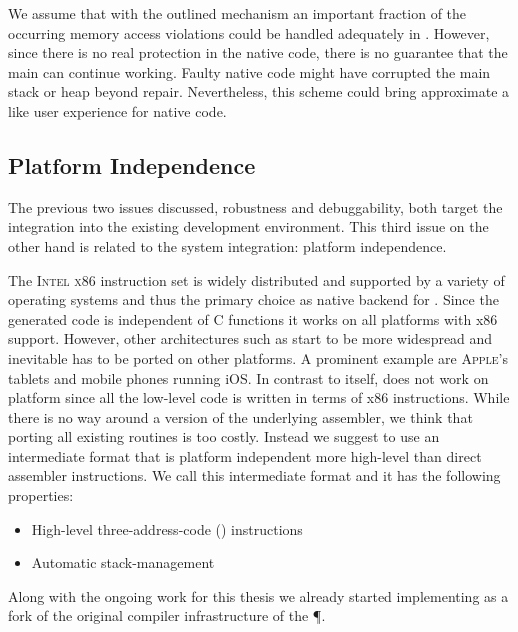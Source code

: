\noindent We assume that with the outlined mechanism an important fraction of the occurring memory access violations could be handled adequately in \PH.
However, since there is no real protection in the native code, there is no guarantee that the main \PH \VM can continue working.
Faulty native code might have corrupted the main \PH stack or heap beyond repair.
Nevertheless, this scheme could bring approximate a \PH like user experience for native \B code.


\subsection{Platform Independence}
The previous two issues discussed, robustness and debuggability, both target the integration into the existing \PH development environment.
This third issue on the other hand is related to the system integration: platform independence.

The \textsc{Intel x86} instruction set is widely distributed and supported by a variety of operating systems and thus the primary choice as native backend for \B.
Since the generated code is independent of C functions it works on all platforms with x86 support.
However, other architectures such as \ARM start to be more widespread and inevitable \B has to be ported on other platforms.
A prominent example are \textsc{Apple}'s tablets and mobile phones running iOS.
In contrast to \PH itself, \B does not work on \ARM platform since all the low-level code is written in terms of x86 instructions.
While there is no way around a \ARM version of the underlying assembler, we think that porting all existing \B routines is too costly.
Instead we suggest to use an intermediate format that is platform independent more high-level than direct assembler instructions.
We call this intermediate format \VCPU and it has the following properties:
%
\begin{itemize}[noitemsep]
	\item High-level three-address-code (\TAC) instructions
	\item Automatic stack-management
\end{itemize}
%
Along with the ongoing work for this thesis we already started implementing \VCPU as a fork of the original compiler infrastructure of the \P \VM.

